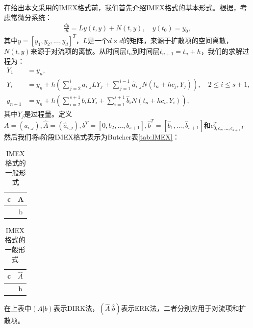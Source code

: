 在给出本文采用的IMEX格式前，我们首先介绍IMEX格式的基本形式。根据\parencite{calvo2001linearly}，考虑常微分系统：
\begin{align}
    \frac{dy}{dt} = Ly(t,y) + N(t,y), \quad y(t_0) = y_0,
\end{align}
其中$y = [y_1, y_2, ..., y_d]^T$，$L$是一个$d\times d$的矩阵，来源于扩散项的空间离散，$N(t,y)$来源于对流项的离散。从时间层$t_n$到时间层$t_{n+1}=t_n+h$，我们的求解过程为：
\begin{align*}
    Y_1     & =y_n,                                                                                                        \\
    Y_i     & = y_n + h(\sum_{j=2}^i a_{i,j}LY_j + \sum_{j=1}^{i-1}\hat{a}_{i,j}N(t_n+hc_j,Y_j)), \quad 2 \leq i \leq s+1, \\
    y_{n+1} & = y_n + h(\sum_{i=2}^{s+1}b_iLY_i+\sum_{i=1}^{s+1}\hat{b}_iN(t_n+hc_i, Y_i)),
\end{align*}
其中$Y_j$是过程量。定义$A = (a_{i,j}), \hat{A} = (\hat{a}_{i,j}), b^T = [0, b_2, ..., b_{s+1}], \hat{b}^T=[\hat{b}_1,...,\hat{b}_{s+1}]$和$c^T_{0, c_2, ..., c_{s+1}}$，然后我们将s阶段IMEX格式表示为Butcher表\autoref{tab:IMEX}：
\begin{table}
    \centering
    \begin{minipage}{0.45\linewidth}
        \centering
        \begin{tabular}{c|c}
            c & A \\
            \hline
              & b
        \end{tabular}
    \end{minipage}
    \begin{minipage}{0.45\linewidth}
        \centering
        \begin{tabular}{c|c}
            c & $\hat{A}$ \\
            \hline
              & b
        \end{tabular}
    \end{minipage}
    \caption{IMEX格式的一般形式}
    \label{tab:IMEX}
\end{table}
在上表中$(A|b)$表示DIRK法，$(\hat{A}|\hat{b})$表示ERK法，二者分别应用于对流项和扩散项。

